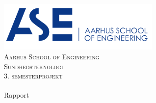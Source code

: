 \begin{titlingpage}
\begin{center}

~ \\[3cm]

\includegraphics[width=0.6\textwidth]{figurer/ASE}~\\[1cm]

\textsc{\LARGE Aarhus School of Engineering}\\[1.5cm]

\textsc{\Large Sundhedsteknologi}\\
\textsc{\Large 3. semesterprojekt}\\[0.5cm]

\noindent\makebox[\linewidth]{\rule{\textwidth}{0.4pt}}\\
[0.5cm]{\Huge Rapport}
\noindent\makebox[\linewidth]{\rule{\textwidth}{0.4pt}}

\end{center}









\vfill



\end{titlingpage}